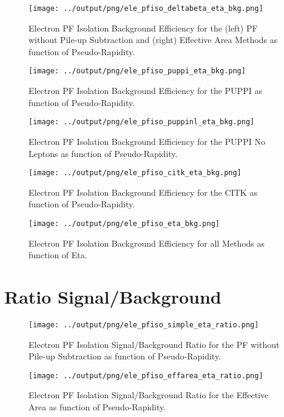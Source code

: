 \documentclass[11pt]{book}
\begin{document}
\begin{figure}[htb]
\centering
\texttt{[image: ../output/png/ele\_pfiso\_deltabeta\_eta\_bkg.png]}
\caption{Electron PF Isolation Background Efficiency for the (left) PF without Pile-up Subtraction and (right) Effective Area Methods as function of Pseudo-Rapidity.}
\label{fig:ele_pfiso_eta_bkg_deltabeta}
\end{figure}

\begin{figure}[htb]
\centering
\texttt{[image: ../output/png/ele\_pfiso\_puppi\_eta\_bkg.png]}
\caption{Electron PF Isolation Background Efficiency for the PUPPI as function of Pseudo-Rapidity.}
\label{fig:ele_pfiso_eta_bkg_puppi}
\end{figure}

\begin{figure}[htb]
\centering
\texttt{[image: ../output/png/ele\_pfiso\_puppinl\_eta\_bkg.png]}
\caption{Electron PF Isolation Background Efficiency for the PUPPI No Leptons as function of Pseudo-Rapidity.}
\label{fig:ele_pfiso_eta_bkg_puppinl}
\end{figure}

\begin{figure}[htb]
\centering
\texttt{[image: ../output/png/ele\_pfiso\_citk\_eta\_bkg.png]}
\caption{Electron PF Isolation Background Efficiency for the CITK as function of Pseudo-Rapidity.}
\label{fig:ele_pfiso_eta_bkg_citk}
\end{figure}

\begin{figure}[htb]
\centering
\texttt{[image: ../output/png/ele\_pfiso\_eta\_bkg.png]}
\caption{Electron PF Isolation Background Efficiency for all Methods as function of Eta.}
\label{fig:ele_pfiso_eta_bkg}
\end{figure}
\clearpage

\chapter{Ratio Signal/Background}
\begin{figure}[htb]
\centering
\texttt{[image: ../output/png/ele\_pfiso\_simple\_eta\_ratio.png]}
\caption{Electron PF Isolation Signal/Background Ratio for the PF without Pile-up Subtraction as function of Pseudo-Rapidity.}
\label{fig:ele_pfiso_eta_ratio_simple}
\end{figure}


\begin{figure}[htb]
\centering
\texttt{[image: ../output/png/ele\_pfiso\_effarea\_eta\_ratio.png]}
\caption{Electron PF Isolation Signal/Background Ratio for the Effective Area as function of Pseudo-Rapidity.}
\label{fig:ele_pfiso_eta_ratio_effarea}
\end{figure}
\end{document}
